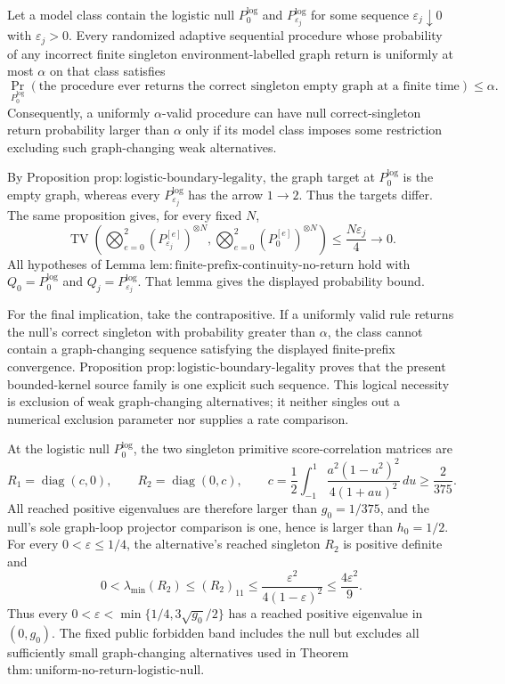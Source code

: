 Let a model class contain the logistic null \(P_0^{\mathrm{log}}\) and \(P_{\varepsilon_j}^{\mathrm{log}}\) for some sequence \(\varepsilon_j\downarrow0\) with \(\varepsilon_j>0\).  Every randomized adaptive sequential procedure whose probability of any incorrect finite singleton environment-labelled graph return is uniformly at most \(\alpha\) on that class satisfies
\[
 \Pr_{P_0^{\mathrm{log}}}\!\left(
   \text{the procedure ever returns the correct singleton empty graph at a finite time}
 \right)\le\alpha.
\]
Consequently, a uniformly \(\alpha\)-valid procedure can have null correct-singleton return probability larger than \(\alpha\) only if its model class imposes some restriction excluding such graph-changing weak alternatives.

By Proposition \(\mathrm{prop{:}logistic\mbox{-}boundary\mbox{-}legality}\), the graph target at \(P_0^{\mathrm{log}}\) is the empty graph, whereas every \(P_{\varepsilon_j}^{\mathrm{log}}\) has the arrow \(1\to2\).  Thus the targets differ.  The same proposition gives, for every fixed \(N\),
\[
 \operatorname{TV}\!\left(
   \bigotimes_{e=0}^2(P_{\varepsilon_j}^{[e]})^{\otimes N},
   \bigotimes_{e=0}^2(P_0^{[e]})^{\otimes N}
 \right)
 \le\frac{N\varepsilon_j}{4}\longrightarrow0.
\]
All hypotheses of Lemma \(\mathrm{lem{:}finite\mbox{-}prefix\mbox{-}continuity\mbox{-}no\mbox{-}return}\) hold with \(Q_0=P_0^{\mathrm{log}}\) and \(Q_j=P_{\varepsilon_j}^{\mathrm{log}}\).  That lemma gives the displayed probability bound.

For the final implication, take the contrapositive.  If a uniformly valid rule returns the null's correct singleton with probability greater than \(\alpha\), the class cannot contain a graph-changing sequence satisfying the displayed finite-prefix convergence.  Proposition \(\mathrm{prop{:}logistic\mbox{-}boundary\mbox{-}legality}\) proves that the present bounded-kernel source family is one explicit such sequence.  This logical necessity is exclusion of weak graph-changing alternatives; it neither singles out a numerical exclusion parameter nor supplies a rate comparison.

At the logistic null \(P_0^{\mathrm{log}}\), the two singleton primitive score-correlation matrices are
\[
 R_1=\operatorname{diag}(c,0),\qquad
 R_2=\operatorname{diag}(0,c),
 \qquad
 c=\frac12\int_{-1}^1\frac{a^2(1-u^2)^2}{4(1+au)^2}\,du
 \ge\frac{2}{375}.
\]
All reached positive eigenvalues are therefore larger than \(g_0=1/375\), and the null's sole graph-loop projector comparison is one, hence is larger than \(h_0=1/2\).  For every \(0<\varepsilon\le1/4\), the alternative's reached singleton \(R_2\) is positive definite and
\[
 0<\lambda_{\min}(R_2)
 \le (R_2)_{11}
 \le\frac{\varepsilon^2}{4(1-\varepsilon)^2}
 \le\frac{4\varepsilon^2}{9}.
\]
Thus every \(0<\varepsilon<\min\{1/4,3\sqrt{g_0}/2\}\) has a reached positive eigenvalue in \((0,g_0)\).  The fixed public forbidden band includes the null but excludes all sufficiently small graph-changing alternatives used in Theorem \(\mathrm{thm{:}uniform\mbox{-}no\mbox{-}return\mbox{-}logistic\mbox{-}null}\).

